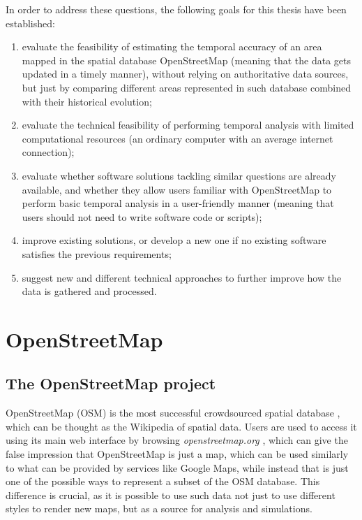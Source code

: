 \documentclass{Configuration_Files/PoliMi3i_thesis}
\begin{document}
In order to address these questions, the following goals for this thesis have been established:
\begin{enumerate}
\item evaluate the feasibility of estimating the temporal accuracy of an area mapped in the spatial database OpenStreetMap (meaning that the data gets updated in a timely manner), without relying on authoritative data sources, but just by comparing different areas represented in such database combined with their historical evolution;
\item evaluate the technical feasibility of performing temporal analysis with limited computational resources (an ordinary computer with an average internet connection);
\item evaluate whether software solutions tackling similar questions are already available, and whether they allow users familiar with OpenStreetMap to perform basic temporal analysis in a user-friendly manner (meaning that users should not need to write software code or scripts);
\item improve existing solutions, or develop a new one if no existing software satisfies the previous requirements;
\item suggest new and different technical approaches to further improve how the data is gathered and processed.
\end{enumerate}

\chapter{OpenStreetMap}
\label{ch:openstreetmap}%

\section{The OpenStreetMap project}
\label{sec:the_openstreetmap_project}%

OpenStreetMap (OSM) is the most successful crowdsourced spatial database \cite{foodyMappingCitizenSensor2017}, which can be thought as the Wikipedia of spatial data. Users are used to access it using its main web interface by browsing \textit{openstreetmap.org} \cite{OpenStreetMap}, which can give the false impression that OpenStreetMap is just a map, which can be used similarly to what can be provided by services like Google Maps, while instead that is just one of the possible ways to represent a subset of the OSM database. This difference is crucial, as it is possible to use such data not just to use different styles to render new maps, but as a source for analysis and simulations.
\end{document}
